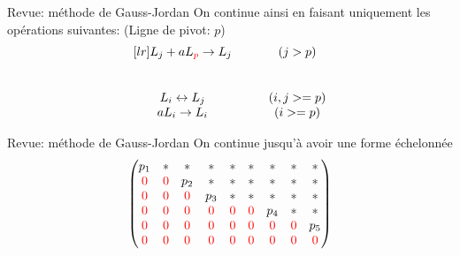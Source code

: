\documentclass[french, handout]{beamer}
\begin{document}
\begin{frame}{Revue: méthode de Gauss-Jordan}
On continue ainsi en faisant uniquement les opérations suivantes: 
(Ligne de pivot: $p$)
\Huge
\[
\begin{matrix}[lr]
 L_j + a L_{\color{red}p} \rightarrow L_j &\qquad(j > p)\\[25pt]
 L_i \leftrightarrow L_j &\qquad(i, j >= p)\\
 a L_i \rightarrow L_i &\qquad(i >= p)
\end{matrix}
\]
\normalsize
\end{frame}			
	
	
\begin{frame}{Revue: méthode de Gauss-Jordan}
On continue jusqu'à avoir une forme échelonnée	
\[
\begin{pmatrix}
p_1 & *  & * & * & * & * & * & * & * \\
{\color{red}{0}} & {\color{red}{0}} & p_2 & * & * & * & * & * & * \\
{\color{red}{0}} & {\color{red}{0}} & {\color{red}{0}} & p_3 & * & * & * & * & * \\ 
{\color{red}{0}} & {\color{red}{0}} & {\color{red}{0}} & {\color{red}{0}} & {\color{red}{0}} & {\color{red}{0}} & p_4 & * & * \\ 
{\color{red}{0}} & {\color{red}{0}} & {\color{red}{0}} & {\color{red}{0}} & {\color{red}{0}} & {\color{red}{0}} & {\color{red}{0}} & {\color{red}{0}} & p_5 \\ 
{\color{red}{0}} & {\color{red}{0}} & {\color{red}{0}} & {\color{red}{0}} & {\color{red}{0}} & {\color{red}{0}} & {\color{red}{0}} & {\color{red}{0}} & {\color{red}{0}} 
\end{pmatrix}
\]	
\end{frame}	
\end{document}
